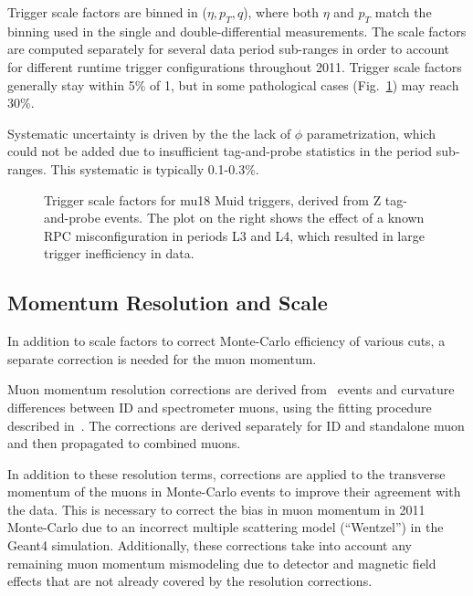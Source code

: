Trigger scale factors are binned in ($\eta,p_T,q$), where both $\eta$ and $p_T$ match the binning used in the single and double-differential measurements. The scale factors are computed separately for several data period sub-ranges in order to account for different runtime trigger configurations throughout 2011. Trigger scale factors generally stay within 5\% of 1, but in some pathological cases (Fig.~\ref{fig:perf:trigsf}) may reach 30\%.

Systematic uncertainty is driven by the the lack of $\phi$ parametrization, which could not be added due to insufficient tag-and-probe statistics in the period sub-ranges. This systematic is typically 0.1-0.3\%.

\begin{figure}[phtb]
  \begin{center}
 \caption{ Trigger scale factors for mu18 Muid triggers, derived from Z tag-and-probe events. The plot on the right shows the effect of a known RPC misconfiguration in periods L3 and L4, which resulted in large trigger inefficiency in data. }
 \label{fig:perf:trigsf}
 \end{center}
\end{figure}

\subsection{Momentum Resolution and Scale}
\label{perf:muon:scale}
In addition to scale factors to correct Monte-Carlo efficiency of various cuts, a separate correction is needed for the muon momentum.

Muon momentum resolution corrections are derived from \Zmm\ events and curvature differences between ID and spectrometer muons, using the fitting procedure described in~\cite{Cerutti:1322424}. The corrections are derived separately for ID and standalone muon and then propagated to combined muons.

In addition to these resolution terms, corrections are applied to the transverse momentum of the muons
in Monte-Carlo events to improve their agreement with the data. This is necessary to correct the bias
in muon momentum in 2011 Monte-Carlo due to an incorrect multiple scattering model (``Wentzel'') in the Geant4 simulation.
Additionally, these corrections take into account any remaining muon momentum mismodeling due to
detector and magnetic field effects that are not already covered by the resolution corrections.

